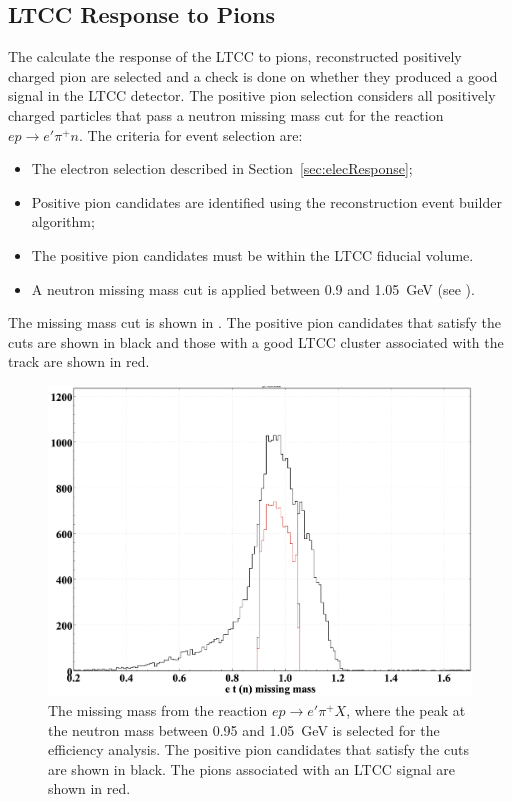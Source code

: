 \subsection{LTCC Response to Pions}

The calculate the response of the LTCC to pions, reconstructed positively charged pion are selected
and a check is done on whether they produced a good signal in the LTCC detector. The positive pion selection
considers all positively charged particles that pass a neutron missing mass cut for the reaction
$ep \to e'\pi^+n$. The criteria for event selection are:

\begin{itemize}
    \item The electron selection described in Section~\ref{sec:elecResponse};
    \item Positive pion candidates are identified using the reconstruction event builder algorithm;
    \item The positive pion candidates must be within the LTCC fiducial volume.
    \item A neutron missing mass cut is applied between 0.9 and 1.05~GeV (see ).
\end{itemize}

The missing mass cut is shown in . The positive pion candidates that satisfy the cuts are shown
in black and those with a good LTCC cluster associated with the track are shown in red.

\begin{figure}
	\centering
	\includegraphics[width=0.98\columnwidth,keepaspectratio]{img/neutronMM.png}
	\caption{The missing mass from the reaction $ep \to e'\pi^+X$, where the peak at the neutron mass
          between 0.95 and 1.05~GeV is selected for the efficiency analysis. The positive pion candidates that
          satisfy the cuts are shown in black. The pions associated with an LTCC signal are shown in red.}
	\label{fig:neutronMM}
\end{figure}

